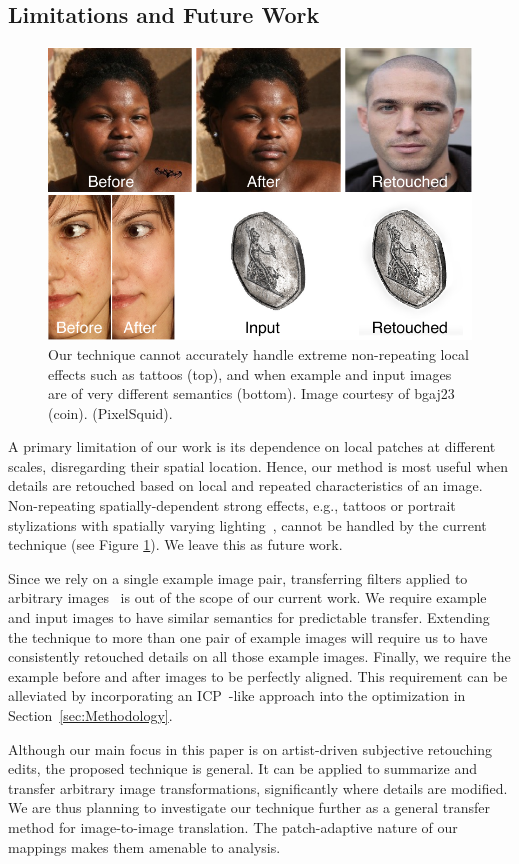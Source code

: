 \subsection{Limitations and Future Work}
\begin{figure}[th] %
	\centering
	\includegraphics[width=0.8\columnwidth]{Chapters/detail-retouching-figs/Limitations.pdf}
    \caption{\label{fig:limitations}Our technique cannot accurately handle extreme non-repeating local effects such as tattoos (top), and when example and input images are of very different semantics (bottom). Image courtesy of bgaj23 (coin). (PixelSquid).}

\end{figure}
A primary limitation of our work is its dependence on local patches at different scales, disregarding their spatial location. Hence, our method is most useful when details are retouched based on local and repeated characteristics of an image. Non-repeating spatially-dependent strong effects, e.g., tattoos or portrait stylizations with spatially varying lighting~\cite{Shih14Style}, cannot be handled by the current technique (see Figure \ref{fig:limitations}). We leave this as future work.


Since we rely on a single example image pair, transferring filters applied to arbitrary images~\cite{Yan14Automatic} is out of the scope of our current work. We require example and input images to have similar semantics for predictable transfer. Extending the technique to more than one pair of example images will require us to have consistently retouched details on all those example images. Finally, we require the example before and after images to be perfectly aligned. This requirement can be alleviated by incorporating an ICP~\cite{Besl92AMethod}-like approach into the optimization in Section~\ref{sec:Methodology}. 

Although our main focus in this paper is on artist-driven subjective retouching edits, the proposed technique is general. It can be applied to summarize and transfer arbitrary image transformations, significantly where details are modified. We are thus planning to investigate our technique further as a general transfer method for image-to-image translation. The patch-adaptive nature of our mappings makes them amenable to analysis.
